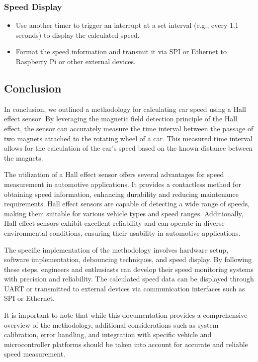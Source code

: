 \documentclass[
12pt,
oneside, 
onehalfspacing, 
nolistspacing, 
parskip, 
chapterinoneline, 
]{AASTCOMPUTER}
\begin{document}
\subsubsection{Speed Display}
\begin{itemize}
    \item Use another timer to trigger an interrupt at a set interval (e.g., every 1.1 seconds) to display the calculated speed.
    \item Format the speed information and transmit it via SPI or Ethernet to Raspberry Pi or other external devices.
\end{itemize}

\subsection{Conclusion}
In conclusion, we outlined a methodology for calculating car speed using a Hall effect sensor. By leveraging the magnetic field detection principle of the Hall effect, the sensor can accurately measure the time interval between the passage of two magnets attached to the rotating wheel of a car. This measured time interval allows for the calculation of the car's speed based on the known distance between the magnets.

The utilization of a Hall effect sensor offers several advantages for speed measurement in automotive applications. It provides a contactless method for obtaining speed information, enhancing durability and reducing maintenance requirements. Hall effect sensors are capable of detecting a wide range of speeds, making them suitable for various vehicle types and speed ranges. Additionally, Hall effect sensors exhibit excellent reliability and can operate in diverse environmental conditions, ensuring their usability in automotive applications.

The specific implementation of the methodology involves hardware setup, software implementation, debouncing techniques, and speed display. By following these steps, engineers and enthusiasts can develop their speed monitoring systems with precision and reliability. The calculated speed data can be displayed through UART or transmitted to external devices via communication interfaces such as SPI or Ethernet.

It is important to note that while this documentation provides a comprehensive overview of the methodology, additional considerations such as system calibration, error handling, and integration with specific vehicle and microcontroller platforms should be taken into account for accurate and reliable speed measurement.
\end{document}
